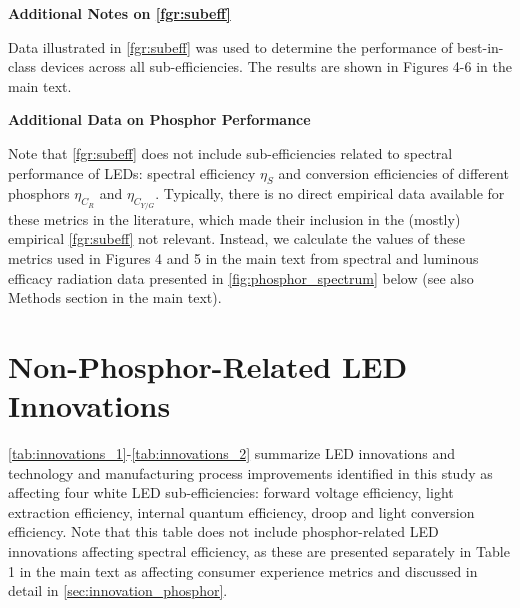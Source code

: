 \documentclass[parskip=full]{article}
\begin{document}
\textbf{Additional Notes on \cref{fgr:subeff}}

Data illustrated in \cref{fgr:subeff} was used to determine the performance of best-in-class devices across all sub-efficiencies. The results are shown in Figures 4-6 in the main text.

\textbf{Additional Data on Phosphor Performance}

Note that \cref{fgr:subeff} does not include sub-efficiencies related to spectral performance of LEDs: spectral efficiency $\eta_S$ and conversion efficiencies of different phosphors $\eta_{C_R}$ and $\eta_{C_{Y/G}}$.  Typically, there is no direct empirical data available for these metrics in the literature, which made their inclusion in the (mostly) empirical \cref{fgr:subeff} not relevant. Instead, we calculate the values of these metrics used in Figures 4 and 5 in the main text from spectral and luminous efficacy radiation data presented in \cref{fig:phosphor_spectrum} below (see also Methods section in the main text).



\clearpage
\section{Non-Phosphor-Related LED Innovations}

\cref{tab:innovations_1}-\cref{tab:innovations_2} summarize LED innovations and technology and manufacturing process improvements identified in this study as affecting four white LED sub-efficiencies: forward voltage efficiency, light extraction efficiency, internal quantum efficiency, droop and light conversion efficiency. Note that this table does not include phosphor-related LED innovations affecting spectral efficiency, as these are presented separately in Table 1 in the main text as affecting consumer experience metrics and discussed in detail in \cref{sec:innovation_phosphor}.
\end{document}
